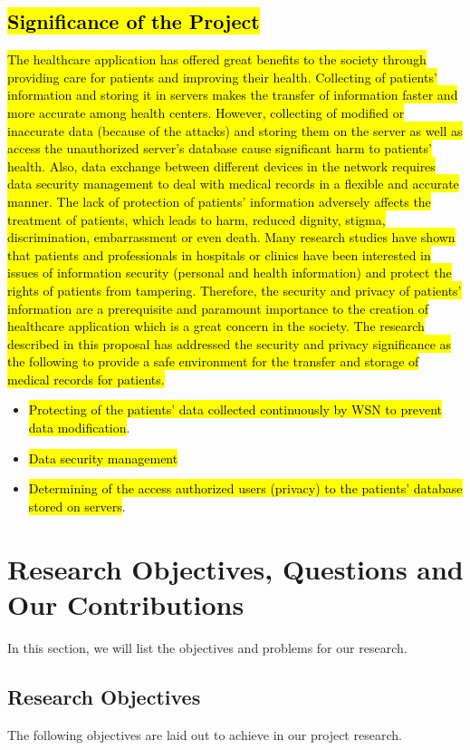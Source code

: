 \documentclass[a4paper,11pt]{article}
\DeclareRobustCommand{\hlyellow}[1]{{\sethlcolor{white}\hl{#1}}}
\begin{document}
\subsection{\hlyellow{Significance of the Project}}
\hlyellow{The healthcare application has offered great benefits to the society through providing care for patients and improving their health. Collecting of patients' information and storing it in servers makes the transfer of information faster and more accurate among health centers. However, collecting of modified or inaccurate data (because of the attacks) and storing them on the server as well as access the unauthorized server's database cause significant harm to patients' health. Also, data exchange between different devices in the network requires data security management to deal with medical records in a flexible and accurate manner. The lack of protection of patients' information adversely affects the treatment of patients, which leads to harm, reduced dignity, stigma, discrimination, embarrassment or even death. Many research studies have shown that patients and professionals in hospitals or clinics have been interested in issues of information security (personal and health information) and protect the rights of patients from tampering. Therefore, the security and privacy of patients' information are a prerequisite and paramount importance to the creation of healthcare application which is a great concern in the society. The research described in this proposal has addressed the security and privacy significance as the following to provide a safe environment for the transfer and storage of medical records for patients.}
\begin{itemize}
\item \hlyellow{Protecting of the patients' data collected continuously by WSN to prevent data modification}.
\item \hlyellow {Data security management}
\item \hlyellow{Determining of the access authorized users (privacy) to the patients' database stored on servers}.  
\end{itemize}


\section{Research Objectives, Questions and Our Contributions}
In this section, we will list the objectives and problems for our research.  

\subsection{Research Objectives}
The following objectives are laid out to achieve in our project research.
\end{document}
